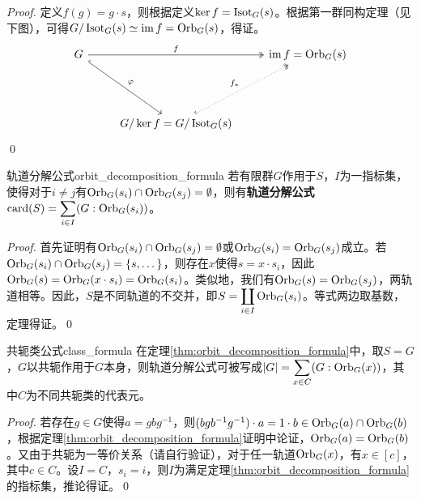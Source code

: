 \documentclass[../main.tex]{subfiles}
\begin{document}
\begin{proof}
定义$f(g)=g\cdot s$，则根据定义$\ker f=\operatorname{Isot}_G(s)$。根据第一群同构定理（见下图），可得$G/\operatorname{Isot}_G(s)\simeq\operatorname{im} f=\operatorname{Orb}_G(s)$，得证。
$$\begin{tikzcd}
G \arrow[rdd, "\varphi", hook] \arrow[rr, "f", two heads] & {} & \im f=\orbit_G(s) \\ {} & {} & {}\\ {} & G/\ker f=G/\isotropy_G(s) \arrow[ruu, "f_*", two heads, dotted, hook] & {}
\end{tikzcd}$$
\qed
\end{proof}
\begin{theorem}{轨道分解公式}{orbit_decomposition_formula}
若有限群$G$作用于$S$，$I$为一指标集，使得对于$i\neq j$有$\operatorname{Orb}_G(s_i)\cap\operatorname{Orb}_G(s_j)=\emptyset$，则有\textbf{轨道分解公式}$\displaystyle\operatorname{card}(S)=\sum_{i\in I}(G:\operatorname{Orb}_G(s_i))$。
\end{theorem}
\begin{proof}
首先证明有$\operatorname{Orb}_G(s_i)\cap\operatorname{Orb}_G(s_j)=\emptyset$或$\operatorname{Orb}_G(s_i)=\operatorname{Orb}_G(s_j)$成立。若$\operatorname{Orb}_G(s_i)\cap\operatorname{Orb}_G(s_j)=\{s,\dots\}$，则存在$x$使得$s=x\cdot s_i$，因此$\operatorname{Orb}_G(s)=\operatorname{Orb}_G(x\cdot s_i)=\operatorname{Orb}_G(s_i)$。类似地，我们有$\operatorname{Orb}_G(s)=\operatorname{Orb}_G(s_j)$，两轨道相等。因此，$S$是不同轨道的不交并，即$\displaystyle S=\coprod_{i\in I}\operatorname{Orb}_G(s_i)$。等式两边取基数，定理得证。\qed
\end{proof}
\begin{corollary}{共轭类公式}{class_formula}
在定理\ref{thm:orbit_decomposition_formula}中，取$S=G$，$G$以共轭作用于$G$本身，则轨道分解公式可被写成$\displaystyle|G|=\sum_{x\in C}(G:\operatorname{Orb}_G(x))$，其中$C$为不同共轭类的代表元。
\end{corollary}
\begin{proof}
若存在$g\in G$使得$a=gbg^{-1}$，则$(bgb^{-1}g^{-1})\cdot a=1\cdot b\in\operatorname{Orb}_G(a)\cap\operatorname{Orb}_G(b)$，根据定理\ref{thm:orbit_decomposition_formula}证明中论证，$\operatorname{Orb}_G(a)=\operatorname{Orb}_G(b)$。又由于共轭为一等价关系（请自行验证），对于任一轨道$\operatorname{Orb}_G(x)$，有$x\in[c]$，其中$c\in C$。设$I=C$，$s_i=i$，则$I$为满足定理\ref{thm:orbit_decomposition_formula}的指标集，推论得证。\qed
\end{proof}
\end{document}
